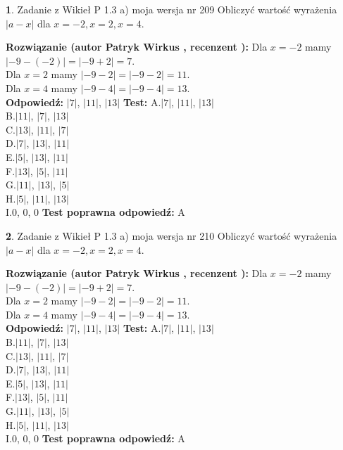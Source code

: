 \documentclass[12pt, a4paper]{article}
\theoremstyle{definition} %
\newtheorem{zad}{}
\newcommand{\zadStart}[1]{\begin{zad}#1\newline}
\newcommand{\zadStop}{\end{zad}}
\newcommand{\rozwStart}[2]{\noindent \textbf{Rozwiązanie (autor #1 , recenzent #2): }\newline}
\newcommand{\rozwStop}{\newline}
\newcommand{\odpStart}{\noindent \textbf{Odpowiedź:}\newline}
\newcommand{\odpStop}{\newline}
\newcommand{\testStart}{\noindent \textbf{Test:}\newline}
\newcommand{\testStop}{\newline}
\newcommand{\kluczStart}{\noindent \textbf{Test poprawna odpowiedź:}\newline}
\newcommand{\kluczStop}{\newline}
\begin{document}
\zadStart{Zadanie z Wikieł P 1.3 a) moja wersja nr 209}
Obliczyć wartość wyrażenia $|a - x|$ dla $x=-2,x=2,x=4$.
\zadStop
\rozwStart{Patryk Wirkus}{}
Dla $x = -2$ mamy $|-9 - (-2)| = |-9 + 2| = 7$.\\
Dla $x = 2$ mamy $|-9 - 2| = |-9 - 2| = 11$.\\
Dla $x = 4$ mamy $|-9 - 4| = |-9 - 4| = 13$.\\
\rozwStop
\odpStart
$|7|$, $|11|$, $|13|$
\odpStop
\testStart
A.$|7|$, $|11|$, $|13|$\\
B.$|11|$, $|7|$, $|13|$\\
C.$|13|$, $|11|$, $|7|$\\
D.$|7|$, $|13|$, $|11|$\\
E.$|5|$, $|13|$, $|11|$\\
F.$|13|$, $|5|$, $|11|$\\
G.$|11|$, $|13|$, $|5|$\\
H.$|5|$, $|11|$, $|13|$\\
I.$0$, $0$, $0$
\testStop
\kluczStart
A
\kluczStop



\zadStart{Zadanie z Wikieł P 1.3 a) moja wersja nr 210}
Obliczyć wartość wyrażenia $|a - x|$ dla $x=-2,x=2,x=4$.
\zadStop
\rozwStart{Patryk Wirkus}{}
Dla $x = -2$ mamy $|-9 - (-2)| = |-9 + 2| = 7$.\\
Dla $x = 2$ mamy $|-9 - 2| = |-9 - 2| = 11$.\\
Dla $x = 4$ mamy $|-9 - 4| = |-9 - 4| = 13$.\\
\rozwStop
\odpStart
$|7|$, $|11|$, $|13|$
\odpStop
\testStart
A.$|7|$, $|11|$, $|13|$\\
B.$|11|$, $|7|$, $|13|$\\
C.$|13|$, $|11|$, $|7|$\\
D.$|7|$, $|13|$, $|11|$\\
E.$|5|$, $|13|$, $|11|$\\
F.$|13|$, $|5|$, $|11|$\\
G.$|11|$, $|13|$, $|5|$\\
H.$|5|$, $|11|$, $|13|$\\
I.$0$, $0$, $0$
\testStop
\kluczStart
A
\kluczStop
\end{document}
